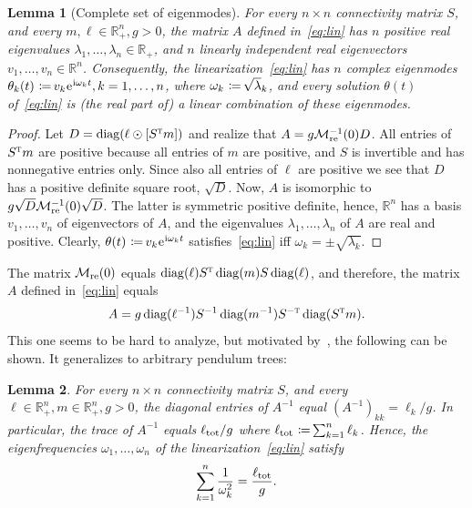 \documentclass[12pt]{article}
\newcommand{\T}{\textsc{t}}
\newcommand{\cM}{\mathcal{M}}
\newcommand{\mi}{\hspace{.4pt}\mathrm{i}}
\newcommand{\e}{\hspace{.4pt}\mathrm{e}}
\theoremstyle{sfdefinition}%
\newtheorem{lemma}{Lemma}[section]
\theoremstyle{sfdefinition}
\newcommand{\mR}{\mathbb{R}}
\DeclareMathOperator{\diag}{diag}
\newcommand{\ep}{\odot}
\DeclareMathOperator{\coloneq}{\,\raisebox{.08ex}{\ensuremath{:}}\!\!=}
\begin{document}
\begin{lemma}[Complete set of eigenmodes]
  For every $n\times n$ connectivity matrix $S$, and every
  $m,\ell\in\mR_+^n,g>0$, the matrix $A$ defined in~\eqref{eq:lin} has
  $n$ positive real eigenvalues $\lambda_1,\ldots,\lambda_n\in\mR_+$,
  and $n$ linearly independent real eigenvectors
  $v_1,\ldots,v_n\in\mR^n$. Consequently, the
  linearization~\eqref{eq:lin} has $n$ complex eigenmodes
  $\theta_k(t)\coloneq v_k\e^{\mi\omega_k t}, k=1,\ldots,n$,
  where $\omega_k\coloneq\sqrt{\lambda}_k$, and every solution
  $\theta(t)$ of~\eqref{eq:lin} is (the real part of) a linear
  combination of these eigenmodes.
\end{lemma}
\begin{proof}
  Let $D=\diag(\ell\ep[S^{\T}m])$ and realize that
  $A=g\cM_{\rm re}^{-1}(0)D$.  All entries of $S^{\T}m$ are positive
  because all entries of $m$ are positive, and $S$ is invertible and
  has nonnegative entries only. Since also all entries of $\ell$ are
  positive we see that $D$ has a positive definite square root,
  $\sqrt{D}$.  Now, $A$ is isomorphic to
  $g\sqrt{D}\cM_{\rm re}^{-1}(0)\sqrt{D}$. The latter is symmetric
  positive definite, hence, $\mR^n$ has a basis
  $ v_1,\ldots,v_n$ of eigenvectors of $A$, and the
  eigenvalues $\lambda_1,\ldots,\lambda_n$ of $A$ are real and
  positive. Clearly,
  $\theta(t)\coloneq v_k\e^{\mi\omega_kt}$
  satisfies~\eqref{eq:lin} iff $\omega_k=\pm\sqrt{\lambda_k}$.
\end{proof}
The matrix $\cM_{\rm re}(0)$ equals
$\diag(\ell)S^{\T}\diag(m)S\diag(\ell)$, and therefore, the matrix $A$
defined in~\eqref{eq:lin} equals
\begin{equation}\label{AAis}
  A = g\diag(\ell^{-1})S^{-1}\diag(m^{-1})S^{-\T}\diag(S^{\T}m).
\end{equation}
This one seems to be hard to analyze, but motivated
by~\cite{BraunM2003}, the following can be shown. It generalizes
\cite[Proposition~1]{BraunM2003} to arbitrary pendulum trees:
%
\begin{lemma}
  For every $n\times n$ connectivity matrix $S$, and every
  $\ell\in\mR_+^n,m\in\mR^n_+,g>0$, the diagonal entries of $A^{-1}$
  equal $(A^{-1})_{kk}=\ell_k/g$. In particular, the trace of $A^{-1}$
  equals $\ell_{\rm tot}/g$ where
  $\ell_{\rm tot}\coloneq\sum_{k=1}^n\ell_k$. Hence, the
  eigenfrequencies $\omega_1,\ldots,\omega_n$ of the
  linearization~\eqref{eq:lin} satisfy
  \[
    \sum_{k=1}^n \frac1{\omega_k^2}=\frac{\ell_{\rm tot}}{g}.
  \]
\end{lemma}
\end{document}
